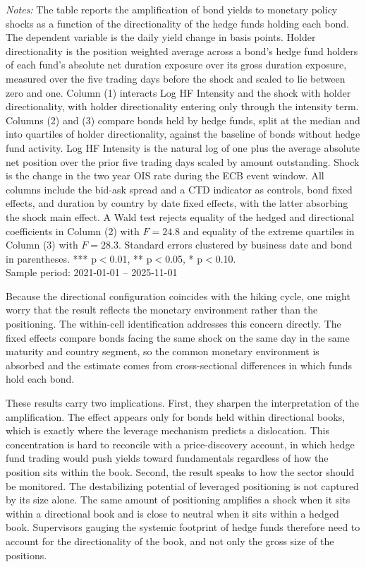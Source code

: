 \documentclass[english, 11pt, oneside]{article}
\begin{document}
\begin{table}[t]
\vspace{1ex}
\raggedright\scriptsize
\textit{Notes:} The table reports the amplification of bond yields to monetary policy shocks as a function of the directionality of the hedge funds holding each bond. The dependent variable is the daily yield change in basis points. Holder directionality is the position weighted average across a bond's hedge fund holders of each fund's absolute net duration exposure over its gross duration exposure, measured over the five trading days before the shock and scaled to lie between zero and one. Column (1) interacts Log HF Intensity and the shock with holder directionality, with holder directionality entering only through the intensity term. Columns (2) and (3) compare bonds held by hedge funds, split at the median and into quartiles of holder directionality, against the baseline of bonds without hedge fund activity. Log HF Intensity is the natural log of one plus the average absolute net position over the prior five trading days scaled by amount outstanding. Shock is the change in the two year OIS rate during the ECB event window. All columns include the bid-ask spread and a CTD indicator as controls, bond fixed effects, and duration by country by date fixed effects, with the latter absorbing the shock main effect. A Wald test rejects equality of the hedged and directional coefficients in Column (2) with $F=24.8$ and equality of the extreme quartiles in Column (3) with $F=28.3$. Standard errors clustered by business date and bond in parentheses. *** p$<$0.01, ** p$<$0.05, * p$<$0.10. \\ Sample period: 2021-01-01 -- 2025-11-01
\end{table}

Because the directional configuration coincides with the hiking cycle, one might worry that the result reflects the monetary environment rather than the positioning. The within-cell identification addresses this concern directly. The fixed effects compare bonds facing the same shock on the same day in the same maturity and country segment, so the common monetary environment is absorbed and the estimate comes from cross-sectional differences in which funds hold each bond.

These results carry two implications. First, they sharpen the interpretation of the amplification. The effect appears only for bonds held within directional books, which is exactly where the leverage mechanism predicts a dislocation. This concentration is hard to reconcile with a price-discovery account, in which hedge fund trading would push yields toward fundamentals regardless of how the position sits within the book. Second, the result speaks to how the sector should be monitored. The destabilizing potential of leveraged positioning is not captured by its size alone. The same amount of positioning amplifies a shock when it sits within a directional book and is close to neutral when it sits within a hedged book. Supervisors gauging the systemic footprint of hedge funds therefore need to account for the directionality of the book, and not only the gross size of the positions.
\end{document}
